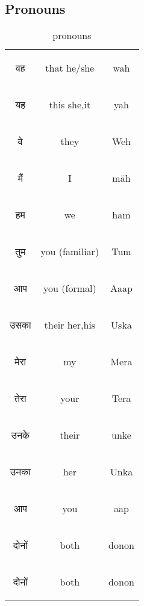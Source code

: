 \newpage 
\subsection{Pronouns}
\begin{table}[H]
    \centering
    \begin{tabular}{c|c|c}
    \begin{hindi} वह \end{hindi} & that he/she & wah \\
    \begin{hindi} यह \end{hindi} & this she,it& yah \\
    \begin{hindi} वे \end{hindi} & they &  Weh \\
    \begin{hindi} मैं \end{hindi} & I & mäh \\    
    \begin{hindi} हम \end{hindi} &  we & ham \\    
    \begin{hindi} तुम \end{hindi} &  you (familiar) & Tum\\    
    \begin{hindi} आप \end{hindi} &  you (formal) & Aaap \\    
    \begin{hindi} उसका  \end{hindi} & their her,his  & Uska \\    
    \begin{hindi} मेरा \end{hindi} &  my & Mera \\    
    \begin{hindi} तेरा \end{hindi} &  your & Tera \\    
    \begin{hindi} उनके \end{hindi} & their & unke \\
    \begin{hindi} उनका \end{hindi} & her & Unka \\
    \begin{hindi} आप \end{hindi} & you & aap \\
    \begin{hindi} दोनों \end{hindi} & both & donon \\
    \begin{hindi} दोनों \end{hindi} & both & donon \\
    \end{tabular}
    \caption{pronouns}    
    \label{tab:pronouns}
\end{table}

